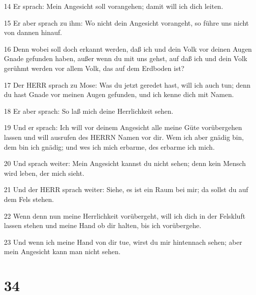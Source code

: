 \par 14 Er sprach: Mein Angesicht soll vorangehen; damit will ich dich leiten.
\par 15 Er aber sprach zu ihm: Wo nicht dein Angesicht vorangeht, so führe uns nicht von dannen hinauf.
\par 16 Denn wobei soll doch erkannt werden, daß ich und dein Volk vor deinen Augen Gnade gefunden haben, außer wenn du mit uns gehst, auf daß ich und dein Volk gerühmt werden vor allem Volk, das auf dem Erdboden ist?
\par 17 Der HERR sprach zu Mose: Was du jetzt geredet hast, will ich auch tun; denn du hast Gnade vor meinen Augen gefunden, und ich kenne dich mit Namen.
\par 18 Er aber sprach: So laß mich deine Herrlichkeit sehen.
\par 19 Und er sprach: Ich will vor deinem Angesicht alle meine Güte vorübergehen lassen und will ausrufen des HERRN Namen vor dir. Wem ich aber gnädig bin, dem bin ich gnädig; und wes ich mich erbarme, des erbarme ich mich.
\par 20 Und sprach weiter: Mein Angesicht kannst du nicht sehen; denn kein Mensch wird leben, der mich sieht.
\par 21 Und der HERR sprach weiter: Siehe, es ist ein Raum bei mir; da sollst du auf dem Fels stehen.
\par 22 Wenn denn nun meine Herrlichkeit vorübergeht, will ich dich in der Felskluft lassen stehen und meine Hand ob dir halten, bis ich vorübergehe.
\par 23 Und wenn ich meine Hand von dir tue, wirst du mir hintennach sehen; aber mein Angesicht kann man nicht sehen.

\chapter{34}

